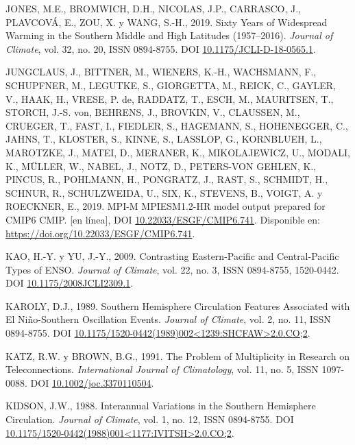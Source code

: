 \documentclass[12pt,oneside,a4paper]{reedthesis}
\newlength{\cslhangindent}
\newenvironment{CSLReferences}[2] %
 {%
  \setlength{\parindent}{0pt}
  \ifodd #1 \everypar{\setlength{\hangindent}{\cslhangindent}}\ignorespaces\fi
  \ifnum #2 > 0
  \setlength{\parskip}{#2\baselineskip}
  \fi
 }%
 {}
\begin{document}
\begin{CSLReferences}{1}{0}
\leavevmode{}%
JONES, M.E., BROMWICH, D.H., NICOLAS, J.P., CARRASCO, J., PLAVCOVÁ, E., ZOU, X. y WANG, S.-H., 2019. Sixty {Years} of {Widespread Warming} in the {Southern Middle} and {High Latitudes} (1957--2016). \emph{Journal of Climate}, vol. 32, no. 20, ISSN 0894-8755. DOI \href{https://doi.org/10.1175/JCLI-D-18-0565.1}{10.1175/JCLI-D-18-0565.1}.

\leavevmode{}%
JUNGCLAUS, J., BITTNER, M., WIENERS, K.-H., WACHSMANN, F., SCHUPFNER, M., LEGUTKE, S., GIORGETTA, M., REICK, C., GAYLER, V., HAAK, H., VRESE, P. de, RADDATZ, T., ESCH, M., MAURITSEN, T., STORCH, J.-S. von, BEHRENS, J., BROVKIN, V., CLAUSSEN, M., CRUEGER, T., FAST, I., FIEDLER, S., HAGEMANN, S., HOHENEGGER, C., JAHNS, T., KLOSTER, S., KINNE, S., LASSLOP, G., KORNBLUEH, L., MAROTZKE, J., MATEI, D., MERANER, K., MIKOLAJEWICZ, U., MODALI, K., MÜLLER, W., NABEL, J., NOTZ, D., PETERS-VON GEHLEN, K., PINCUS, R., POHLMANN, H., PONGRATZ, J., RAST, S., SCHMIDT, H., SCHNUR, R., SCHULZWEIDA, U., SIX, K., STEVENS, B., VOIGT, A. y ROECKNER, E., 2019. MPI-M MPIESM1.2-HR model output prepared for CMIP6 CMIP. {[}en línea{]}, DOI \href{https://doi.org/10.22033/ESGF/CMIP6.741}{10.22033/ESGF/CMIP6.741}. Disponible en: \url{https://doi.org/10.22033/ESGF/CMIP6.741}.

\leavevmode{}%
KAO, H.-Y. y YU, J.-Y., 2009. Contrasting {Eastern-Pacific} and {Central-Pacific Types} of {ENSO}. \emph{Journal of Climate}, vol. 22, no. 3, ISSN 0894-8755, 1520-0442. DOI \href{https://doi.org/10.1175/2008JCLI2309.1}{10.1175/2008JCLI2309.1}.

\leavevmode{}%
KAROLY, D.J., 1989. Southern {Hemisphere Circulation Features Associated} with {El Ni{ñ}o-Southern Oscillation Events}. \emph{Journal of Climate}, vol. 2, no. 11, ISSN 0894-8755. DOI \href{https://doi.org/10.1175/1520-0442(1989)002\%3C1239:SHCFAW\%3E2.0.CO;2}{10.1175/1520-0442(1989)002\textless1239:SHCFAW\textgreater2.0.CO;2}.

\leavevmode{}%
KATZ, R.W. y BROWN, B.G., 1991. The Problem of Multiplicity in Research on Teleconnections. \emph{International Journal of Climatology}, vol. 11, no. 5, ISSN 1097-0088. DOI \href{https://doi.org/10.1002/joc.3370110504}{10.1002/joc.3370110504}.

\leavevmode{}%
KIDSON, J.W., 1988. Interannual {Variations} in the {Southern Hemisphere Circulation}. \emph{Journal of Climate}, vol. 1, no. 12, ISSN 0894-8755. DOI \href{https://doi.org/10.1175/1520-0442(1988)001\%3C1177:IVITSH\%3E2.0.CO;2}{10.1175/1520-0442(1988)001\textless1177:IVITSH\textgreater2.0.CO;2}.


\end{CSLReferences}
\end{document}
